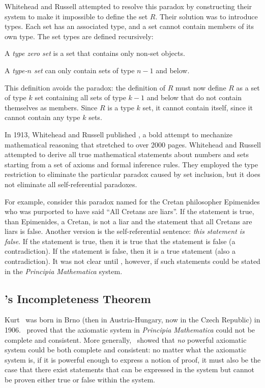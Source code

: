 \begin{schemeregion}
Whitehead and Russell attempted to resolve this paradox by constructing their system to make it impossible to define the set $R$.  Their solution was to introduce types.  Each set has an associated type, and a set cannot contain members of its own type.  The set types are defined recursively:
\begin{itemtight}
\item A \emph{type zero set} is a set that contains only non-set objects.  
\item A \emph{type-$n$ set} can only contain sets of type $n-1$ and below.  
\end{itemtight}
This definition avoids the paradox: the definition of $R$ must now define $R$ as a set of type $k$ set containing all sets of type $k-1$ and below that do not contain themselves as members.  Since $R$ is a type $k$ set, it cannot contain itself, since it cannot contain any type $k$ sets.  

In 1913, Whitehead and Russell published , a bold attempt to mechanize mathematical reasoning that stretched to over 2000 pages.  Whitehead and Russell attempted to derive all true mathematical statements about numbers and sets starting from a set of axioms and formal inference rules.  They employed the type restriction to eliminate the particular paradox caused by set inclusion, but it does not eliminate all self-referential paradoxes.  

For example, consider this paradox named for the Cretan philosopher Epimenides who was purported to have said ``All Cretans are liars''.  If the statement is true, than Epimenides, a Cretan, is not a liar and the statement that all Cretans are liars is false.  Another version is the self-referential sentence: \emph{this statement is false}.  If the statement is true, then it is true that the statement is false (a contradiction).  If the statement is false, then it is a true statement (also a contradiction).  It was not clear until \Godel, however, if such statements could be stated in the \emph{Principia Mathematica} system.  

\subsection{\Godel's Incompleteness Theorem}

Kurt \Godel\ was born in Brno (then in Austria-Hungary, now in the Czech Republic) in 1906. \Godel\ proved that the axiomatic system in \emph{Principia Mathematica} could not be complete and consistent.  More generally, \Godel\ showed that \emph{no} powerful axiomatic system could be both complete and consistent: no matter what the axiomatic system is, if it is powerful enough to express a notion of proof, it must also be the case that there exist statements that can be expressed in the system but cannot be proven either true or false within the system.  


\end{schemeregion}
